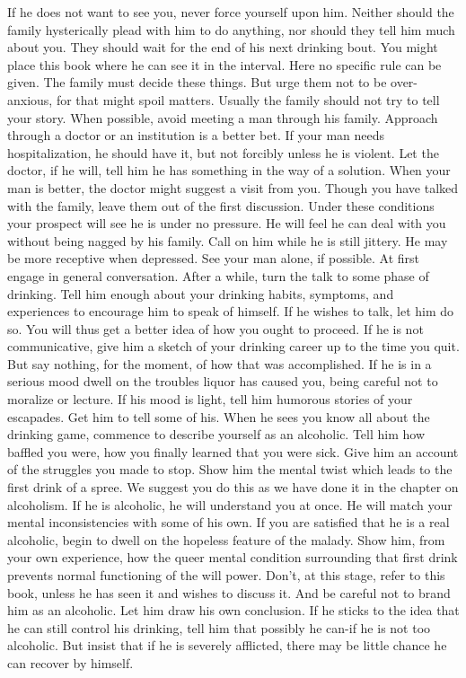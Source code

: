 \begin{biblechapter}
If he does not want to see you, never force yourself upon him.  Neither should the family hysterically plead with him to do anything, nor should they tell him much about you.  They should wait for the end of his next drinking bout.  You might place this book where he can see it in the interval.  Here no specific rule can be given.  The family must decide these things.  But urge them not to be over-anxious, for that might spoil matters.
Usually the family should not try to tell your story.  When possible, avoid meeting a man through his family.  Approach through a doctor or an institution is a better bet.  If your man needs hospitalization, he should have it, but not forcibly unless he is violent.  Let the doctor, if he will, tell him he has something in the way of a solution.
When your man is better, the doctor might suggest a visit from you.  Though you have talked with the family, leave them out of the first discussion.  Under these conditions your prospect will see he is under no pressure.  He will feel he can deal with you without being nagged by his family.  Call on him while he is still jittery.  He may be more receptive when depressed.
See your man alone, if possible.  At first engage in general conversation.  After a while, turn the talk to some phase of drinking.  Tell him enough about your drinking habits, symptoms, and experiences to encourage him to speak of himself.  If he wishes to talk, let him do so.  You will thus get a better idea of how you ought to proceed.  If he is not communicative, give him a sketch of your drinking career up to the time you quit.  But say nothing, for the moment, of how that was accomplished.  If he is in a serious mood dwell on the troubles liquor has caused you, being careful not to moralize or lecture.  If his mood is light, tell him humorous stories of your escapades.  Get him to tell some of his.
When he sees you know all about the drinking game, commence to describe yourself as an alcoholic.  Tell him how baffled you were, how you finally learned that you were sick.  Give him an account of the struggles you made to stop.  Show him the mental twist which leads to the first drink of a spree.  We suggest you do this as we have done it in the chapter on alcoholism.  If he is alcoholic, he will understand you at once.  He will match your mental inconsistencies with some of his own.
If you are satisfied that he is a real alcoholic, begin to dwell on the hopeless feature of the malady.  Show him, from your own experience, how the queer mental condition surrounding that first drink prevents normal functioning of the will power.  Don't, at this stage, refer to this book, unless he has seen it and wishes to discuss it.  And be careful not to brand him as an alcoholic.  Let him draw his own conclusion.  If he sticks to the idea that he can still control his drinking, tell him that possibly he can-if he is not too alcoholic.  But insist that if he is severely afflicted, there may be little chance he can recover by himself.

\end{biblechapter}
